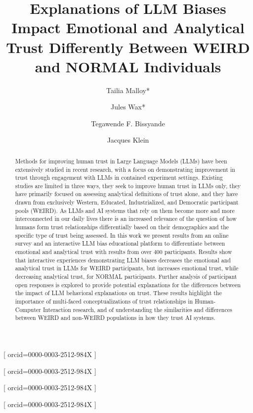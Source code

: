 \documentclass[a4paper,fleqn]{cas-sc}
\begin{document}
\let\WriteBookmarks\relax
\def\floatpagepagefraction{1}
\def\textpagefraction{.001}

\title [mode=title]{Explanations of LLM Biases Impact Emotional and Analytical Trust Differently Between WEIRD and NORMAL Individuals}

\author[1]{Tailia Malloy*}[
            orcid=0000-0003-2512-984X
            ]
\author[1]{Jules Wax*}[
            orcid=0000-0003-2512-984X
            ]

\author[1]{Tegawende F. Bissyande}[
            orcid=0000-0003-2512-984X
            ]

\author[1]{Jacques Klein}[
            orcid=0000-0003-2512-984X
            ]



\begin{abstract}
Methods for improving human trust in Large Language Models (LLMs) have been extensively studied in recent research, with a focus on demonstrating improvement in trust through engagement with LLMs in contained experiment settings. Existing studies are limited in three ways, they seek to improve human trust in LLMs only, they have primarily focused on assessing analytical definitions of trust alone, and they have drawn from exclusively Western, Educated, Industrialized, and Democratic participant pools (WEIRD). As LLMs and AI systems that rely on them become more and more interconnected in our daily lives there is an increased relevance of the question of how humans form trust relationships differentially based on their demographics and the specific type of trust being assessed. In this work we present results from an online survey and an interactive LLM bias educational platform to differentiate between emotional and analytical trust with results from over 400 participants. Results show that interactive experiences demonstrating LLM biases decreases the emotional and analytical trust in LLMs for WEIRD participants, but increases emotional trust, while decreasing analytical trust, for NORMAL participants. Further analysis of participant open responses is explored to provide potential explanations for the differences between the impact of LLM behavioral explanations on trust. These results highlight the importance of multi-faced conceptualizations of trust relationships in Human-Computer Interaction research, and of understanding the similarities and differences between WEIRD and non-WEIRD populations in how they trust AI systems. 
\end{abstract}
\end{document}
